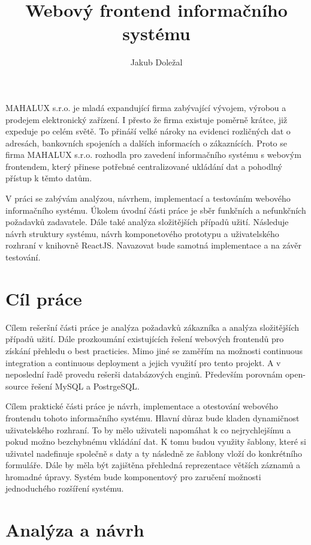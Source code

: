 \documentclass[thesis=B,czech]{FITthesis}[2012/06/26]
\title{Webový frontend informačního systému}
\author{Jakub Doležal} %
\begin{document}

\begin{introduction}
	MAHALUX s.r.o. je mladá expandující firma zabývající vývojem, výrobou a prodejem elektronický zařízení. I přesto že firma existuje poměrně krátce, již expeduje po celém světě. To přináší velké nároky na evidenci rozličných dat o adresách, bankovních spojeních a dalších informacích o zákaznících. Proto se firma MAHALUX s.r.o. rozhodla pro zavedení informačního systému s webovým frontendem, který přinese potřebné centralizované ukládání dat a pohodlný přístup k těmto datům.
	
	V práci se zabývám analýzou, návrhem, implementací a testováním webového informačního systému.
	Úkolem úvodní části práce je sběr funkčních a nefunkčních požadavků zadavatele. Dále také analýza složitějších případů užití.
	Následuje návrh struktury systému, návrh komponetového prototypu a uživatelského rozhraní v knihovně ReactJS. Navazovat bude samotná implementace a na závěr testování.
\end{introduction}

\chapter{Cíl práce}
	Cílem rešeršní části práce je analýza požadavků zákazníka a analýza složitějších případů užití. Dále prozkoumání existujících řešení webových frontendů pro získání přehledu o best practicies. Mimo jiné se zaměřím na možnosti continuous integration a continuous deployment a jejich využití pro tento projekt. A v neposlední řadě provedu rešerši databázových enginů. Především porovnám open-source řešení MySQL a PostrgeSQL.
	
	Cílem praktické části práce je návrh, implementace a otestování webového frontendu tohoto informačního systému. Hlavní důraz bude kladen dynamičnost uživatelského rozhraní. To by mělo uživateli napomáhat k co nejrychlejšímu a pokud možno bezchybnému vkládání dat. K tomu budou využity šablony, které si uživatel nadefinuje společně s daty a ty následně ze šablony vloží do konkrétního formuláře. Dále by měla být zajištěna přehledná reprezentace větších záznamů a hromadné úpravy. Systém bude komponentový pro zaručení možnosti jednoduchého rozšíření systému.
	
\chapter{Analýza a návrh}
\end{document}

